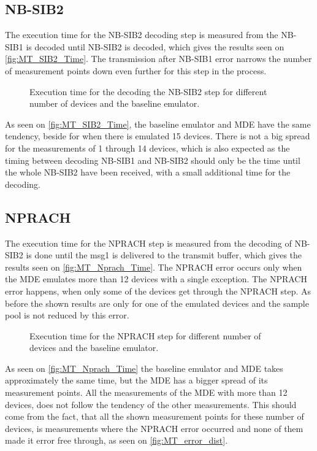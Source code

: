 \subsection{NB-SIB2}
The execution time for the NB-SIB2 decoding step is measured from the NB-SIB1 is decoded until NB-SIB2 is decoded, which gives the results seen on \autoref{fig:MT_SIB2_Time}. The transmission after NB-SIB1 error narrows the number of measurement points down even further for this step in the process.

\begin{figure}[H]
\centering

\caption{Execution time for the decoding the NB-SIB2 step for different number of devices and the baseline emulator.}
\label{fig:MT_SIB2_Time}
\end{figure}


As seen on \autoref{fig:MT_SIB2_Time}, the baseline emulator and MDE have the same tendency, beside for when there is emulated 15 devices. There is not a big spread for the measurements of 1 through 14 devices, which is also expected as the timing between decoding NB-SIB1 and NB-SIB2 should only be the time until the whole NB-SIB2 have been received, with a small additional time for the decoding. 


\subsection{NPRACH}
The execution time for the NPRACH step is measured from the decoding of NB-SIB2 is done until the msg1 is delivered to the transmit buffer, which gives the results seen on \autoref{fig:MT_Nprach_Time}. The NPRACH error occurs only when the MDE emulates more than 12 devices with a single exception. The NPRACH error happens, when only some of the devices get through the NPRACH step. As before the shown results are only for one of the emulated devices and the sample pool is not reduced by this error.

\begin{figure}[H]
\centering
\resizebox{0.5\textwidth}{!}{
}
\caption{Execution time for the NPRACH step for different number of devices and the baseline emulator.}
\label{fig:MT_Nprach_Time}
\end{figure}

As seen on \autoref{fig:MT_Nprach_Time} the baseline emulator and MDE takes approximately the same time, but the MDE has a bigger spread of its measurement points. All the measurements of the MDE with more than 12 devices, does not follow the tendency of the other measurements. This should come from the fact, that all the shown measurement points for these number of devices, is measurements where the NPRACH error occurred and none of them made it error free through, as seen on \autoref{fig:MT_error_dist}.

